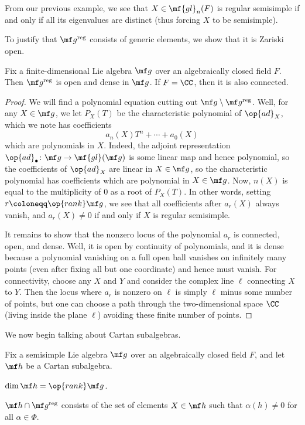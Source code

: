 \documentclass[../notes.tex]{subfiles}
\begin{document}
\begin{example}
	From our previous example, we see that $X\in\mf{gl}_n(F)$ is regular semisimple if and only if all its eigenvalues are distinct (thus forcing $X$ to be semisimple).
\end{example}
To justify that $\mf g^{\mathrm{reg}}$ consists of generic elements, we show that it is Zariski open.
\begin{lemma}
	Fix a finite-dimensional Lie algebra $\mf g$ over an algebraically closed field $F$. Then $\mf g^{\mathrm{reg}}$ is open and dense in $\mf g$. If $F=\CC$, then it is also connected.
\end{lemma}
\begin{proof}
	We will find a polynomial equation cutting out $\mf g\setminus\mf g^{\mathrm{reg}}$. Well, for any $X\in\mf g$, we let $P_X(T)$ be the characteristic polynomial of $\op{ad}_X$, which we note has coefficients
	\[a_n(X)T^n+\cdots+a_0(X)\]
	which are polynomials in $X$. Indeed, the adjoint representation $\op{ad}_\bullet\colon\mf g\to\mf{gl}(\mf g)$ is some linear map and hence polynomial, so the coefficients of $\op{ad}_X$ are linear in $X\in\mf g$, so the characteristic polynomial has coefficients which are polynomial in $X\in\mf g$. Now, $n(X)$ is equal to the multiplicity of $0$ as a root of $P_X(T)$. In other words, setting $r\coloneqq\op{rank}\mf g$, we see that all coefficients after $a_r(X)$ always vanish, and $a_r(X)\ne0$ if and only if $X$ is regular semisimple.

	It remains to show that the nonzero locus of the polynomial $a_r$ is connected, open, and dense. Well, it is open by continuity of polynomials, and it is dense because a polynomial vanishing on a full open ball vanishes on infinitely many points (even after fixing all but one coordinate) and hence must vanish. For connectivity, choose any $X$ and $Y$ and consider the complex line $\ell$ connecting $X$ to $Y$. Then the locus where $a_r$ is nonzero on $\ell$ is simply $\ell$ minus some number of points, but one can choose a path through the two-dimensional space $\CC$ (living inside the plane $\ell$) avoiding these finite number of points.
\end{proof}
We now begin talking about Cartan subalgebras.
\begin{lemma}
	Fix a semisimple Lie algebra $\mf g$ over an algebraically closed field $F$, and let $\mf h$ be a Cartan subalgebra.
	\begin{listalph}
		\item $\dim\mf h=\op{rank}\mf g$.
		\item $\mf h\cap\mf g^{\mathrm{reg}}$ consists of the set of elements $X\in\mf h$ such that $\alpha(h)\ne0$ for all $\alpha\in\Phi$.
	\end{listalph}
\end{lemma}
\end{document}
